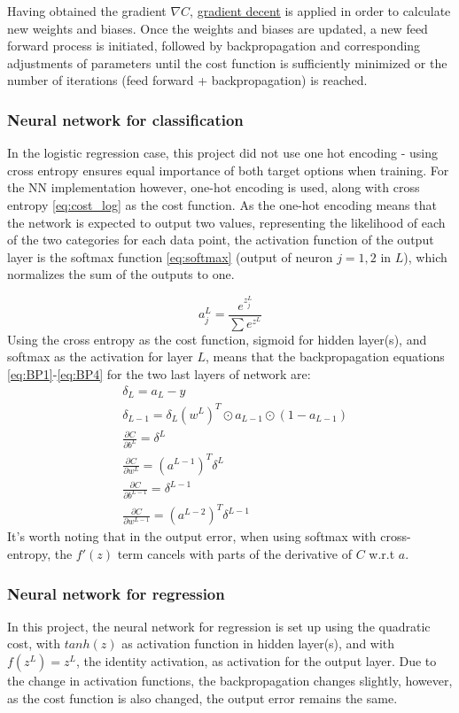 \documentclass[%
oneside,                 %
final,                   %
10pt]{article}
\begin{document}
Having obtained the gradient $\nabla C$, \hyperref[Section_M_GD]{gradient decent} is applied in order to calculate new weights and biases. Once the weights and biases are updated, a new feed forward process is initiated, followed by backpropagation and corresponding adjustments of parameters until the cost function is sufficiently minimized or the number of iterations (feed forward + backpropagation) is reached. 

\subsubsection{Neural network for classification}  \label{Section_M_NNclass}
In the logistic regression case, this project did not use one hot encoding - using  cross entropy ensures equal importance of both target options when training. For the NN implementation however, one-hot encoding is used, along with cross entropy \eqref{eq:cost_log} as the cost function. As the one-hot encoding means that the network is expected to output two values, representing the likelihood of each of the two categories for each data point, the activation function of the output layer is the softmax function \eqref{eq:softmax} (output of neuron $j=1,2$ in $L$), which normalizes the sum of the outputs to one.  

\begin{equation}
a_j^L= \frac{e^{z_j^L}}{\sum e^{z^L}}
\label{eq:softmax}
\end{equation}
Using the cross entropy as the cost function, sigmoid for hidden layer(s), and softmax as the activation for layer $L$, means that the backpropagation equations \eqref{eq:BP1}-\eqref{eq:BP4} for the two last layers of network are:
\begin{align*}
&\delta_L=a_L-y \\   
&\delta_{L-1}=\delta_L(w^{L})^T \odot  a_{L-1} \odot (1- a_{L-1})\\ 
&\frac{\partial C}{\partial b^L} =\delta^L\\ 
&\frac{\partial C}{\partial w^L} =(a^{L-1})^T \delta^{L}  \\
&\frac{\partial C}{\partial b^{L-1}} =\delta^{L-1}\\ 
&\frac{\partial C}{\partial w^{L-1}} =(a^{L-2})^T \delta^{L-1} 
\end{align*}
It's worth noting that in the output error, when using softmax with cross-entropy, the $f'(z)$ term cancels with parts of the derivative of $C$ w.r.t $a$.
\subsubsection{Neural network for regression}  \label{Section_M_NNregression}
In this project, the neural network for regression is set up using the quadratic cost, with $tanh (z)$ as activation function in hidden layer(s), and with $f(z^L)=z^L$, the identity activation, as activation for the output layer. Due to the change in activation functions, the backpropagation changes slightly, however, as the cost function is also changed, the output error remains the same.
\end{document}
